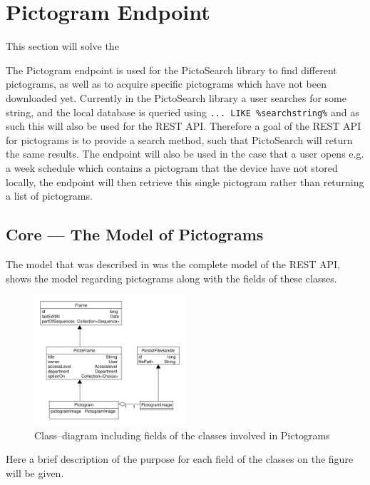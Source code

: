 \section{Pictogram Endpoint}\label{sec:pictogramendpoint}
This section will solve the 

The Pictogram endpoint is used for the PictoSearch library to find different pictograms, as well as to acquire specific pictograms which have not been downloaded yet.
Currently in the PictoSearch library a user searches for some string, and the local database is queried using \texttt{... LIKE \%searchstring\%} and as such this will also be used for the REST API.
Therefore a goal of the REST API for pictograms is to provide a search method, such that PictoSearch will return the same results.
The endpoint will also be used in the case that a user opens e.g. a week schedule which contains a pictogram that the device have not stored locally, the endpoint will then retrieve this single pictogram rather than returning a list of pictograms.

\subsection{Core --- The Model of Pictograms}\label{subsec:pictomodel}
The model that was described in  was the complete model of the REST API,  shows the model regarding pictograms along with the fields of these classes.

\begin{figure}[h]
    \centering
    \includegraphics[width=0.5\textwidth]{figures/pictogrammodel.pdf}
    \caption{Class--diagram including fields of the classes involved in Pictograms}\label{fig:pictogramModel}
\end{figure}

Here a brief description of the purpose for each field of the classes on the figure will be given.
